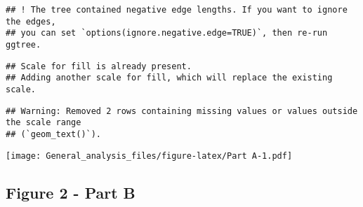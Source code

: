 \documentclass[
]{article}
\begin{document}
\begin{verbatim}
## ! The tree contained negative edge lengths. If you want to ignore the edges,
## you can set `options(ignore.negative.edge=TRUE)`, then re-run ggtree.
\end{verbatim}

\begin{verbatim}
## Scale for fill is already present.
## Adding another scale for fill, which will replace the existing scale.
\end{verbatim}

\begin{verbatim}
## Warning: Removed 2 rows containing missing values or values outside the scale range
## (`geom_text()`).
\end{verbatim}

\texttt{[image: General\_analysis\_files/figure-latex/Part A-1.pdf]}

\hypertarget{figure-2---part-b}{%
\subsection{Figure 2 - Part B}\label{figure-2---part-b}}
\end{document}

